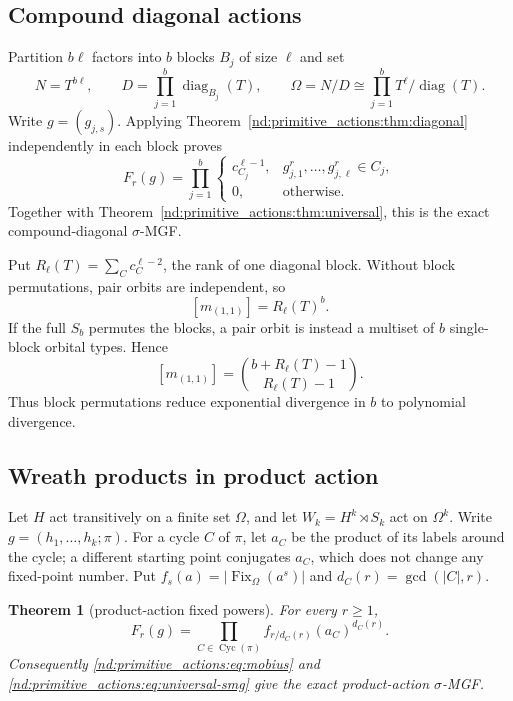 \documentclass[10pt]{article}
\newcommand{\Fix}{\operatorname{Fix}}
\newcommand{\Cyc}{\operatorname{Cyc}}
\newtheorem{theorem}{Theorem}
\begin{document}
\subsection{Compound diagonal actions}

Partition $b\ell$ factors into $b$ blocks $B_j$ of size $\ell$ and set
\[
 N=T^{b\ell},\qquad
 D=\prod_{j=1}^b\operatorname{diag}_{B_j}(T),\qquad
 \Omega=N/D\cong\prod_{j=1}^b T^\ell/\operatorname{diag}(T).
\]
Write $g=(g_{j,s})$.  Applying Theorem~\ref{nd:primitive_actions:thm:diagonal} independently in
each block proves
\begin{equation}\label{nd:primitive_actions:eq:compound-fixed}
 \boxed{F_r(g)=\prod_{j=1}^b
 \begin{cases}
 c_{C_j}^{\ell-1},&g_{j,1}^r,\ldots,g_{j,\ell}^r\in C_j,\\
 0,&\text{otherwise}.
 \end{cases}}
\end{equation}
Together with Theorem~\ref{nd:primitive_actions:thm:universal}, this is the exact compound-diagonal
$\sigma$-MGF.

Put $R_\ell(T)=\sum_Cc_C^{\ell-2}$, the rank of one diagonal block.  Without
block permutations, pair orbits are independent, so
\[
 [m_{(1,1)}]=R_\ell(T)^b.
\]
If the full $S_b$ permutes the blocks, a pair orbit is instead a multiset of
$b$ single-block orbital types.  Hence
\begin{equation}\label{nd:primitive_actions:eq:compound-pair}
 \boxed{[m_{(1,1)}]=\binom{b+R_\ell(T)-1}{R_\ell(T)-1}.}
\end{equation}
Thus block permutations reduce exponential divergence in $b$ to polynomial
divergence.

\subsection{Wreath products in product action}

Let $H$ act transitively on a finite set $\Omega$, and let
$W_k=H^k\rtimes S_k$ act on $\Omega^k$.  Write
$g=(h_1,\ldots,h_k;\pi)$.  For a cycle $C$ of $\pi$, let $a_C$ be the
product of its labels around the cycle; a different starting point conjugates
$a_C$, which does not change any fixed-point number.  Put
$f_s(a)=|\Fix_\Omega(a^s)|$ and $d_C(r)=\gcd(|C|,r)$.

\begin{theorem}[product-action fixed powers]\label{nd:primitive_actions:thm:product-fixed}
For every $r\ge1$,
\begin{equation}\label{nd:primitive_actions:eq:product-fixed}
 \boxed{F_r(g)=\prod_{C\in\Cyc(\pi)}
 f_{r/d_C(r)}(a_C)^{d_C(r)}.}
\end{equation}
Consequently \eqref{nd:primitive_actions:eq:mobius} and \eqref{nd:primitive_actions:eq:universal-smg} give the exact
product-action $\sigma$-MGF.
\end{theorem}
\end{document}
